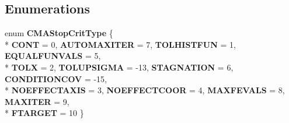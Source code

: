 \subsection*{Enumerations}
\begin{DoxyCompactItemize}
\item 
\hypertarget{namespacelibcmaes_a4b3f1e386e18e0879fad0f07b1a6257a}{enum {\bfseries C\+M\+A\+Stop\+Crit\+Type} \{ \\*
{\bfseries C\+O\+N\+T} = 0, 
{\bfseries A\+U\+T\+O\+M\+A\+X\+I\+T\+E\+R} = 7, 
{\bfseries T\+O\+L\+H\+I\+S\+T\+F\+U\+N} = 1, 
{\bfseries E\+Q\+U\+A\+L\+F\+U\+N\+V\+A\+L\+S} = 5, 
\\*
{\bfseries T\+O\+L\+X} = 2, 
{\bfseries T\+O\+L\+U\+P\+S\+I\+G\+M\+A} = -\/13, 
{\bfseries S\+T\+A\+G\+N\+A\+T\+I\+O\+N} = 6, 
{\bfseries C\+O\+N\+D\+I\+T\+I\+O\+N\+C\+O\+V} = -\/15, 
\\*
{\bfseries N\+O\+E\+F\+F\+E\+C\+T\+A\+X\+I\+S} = 3, 
{\bfseries N\+O\+E\+F\+F\+E\+C\+T\+C\+O\+O\+R} = 4, 
{\bfseries M\+A\+X\+F\+E\+V\+A\+L\+S} = 8, 
{\bfseries M\+A\+X\+I\+T\+E\+R} = 9, 
\\*
{\bfseries F\+T\+A\+R\+G\+E\+T} = 10
 \}}\label{namespacelibcmaes_a4b3f1e386e18e0879fad0f07b1a6257a}

\end{DoxyCompactItemize}
